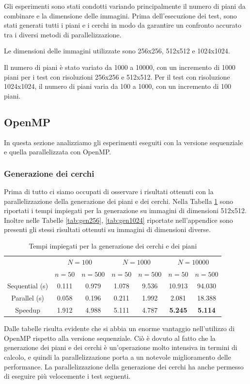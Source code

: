 Gli esperimenti sono stati condotti variando principalmente il numero di piani da combinare e la dimensione delle immagini.
Prima dell'esecuzione dei test, sono stati generati tutti i piani e i cerchi in modo da garantire un confronto accurato
tra i diversi metodi di parallelizzazione.\par
Le dimensioni delle immagini utilizzate sono 256x256, 512x512 e 1024x1024.

Il numero di piani è stato variato da 1000 a 10000, con un incremento di 1000 piani per i test con risoluzioni 256x256 e 512x512.
Per il test con risoluzione 1024x1024, il numero di piani varia da 100 a 1000, con un incremento di 100 piani.

\subsection{OpenMP}\label{subsec:test_openmp}
In questa sezione analizziamo gli esperimenti eseguiti con la versione sequenziale e quella parallelizzata con OpenMP.
\subsubsection{Generazione dei cerchi}
Prima di tutto ci siamo occupati di osservare i risultati ottenuti con la parallelizzazione della generazione dei piani e dei cerchi.
Nella Tabella \ref{tab:gen512} sono riportati i tempi impiegati per la generazione su immagini di dimensioni 512x512.
Inoltre nelle Tabelle \ref{tab:gen256}, \ref{tab:gen1024} riportate nell'appendice sono presenti gli stessi risultati ottenuti su immagini di dimensioni diverse.
\begin{table}[H]
    \centering
    \begin{tabular}{c|c|c|c|c|c|c|}
        & \multicolumn{2}{|c|}{$N = 100$} & \multicolumn{2}{|c|}{$N = 1000$} & \multicolumn{2}{|c|}{$N = 10000$} \\
        & $n=50$ & $n=500$ & $n=50$ & $n=500$ & $n=50$ & $n=500$ \\
        \hline
        Sequential (s) & 0.111 & 0.979 & 1.078 & 9.536 & 10.913 & 94.030 \\
        Parallel (s) & 0.058 & 0.196 & 0.211 & 1.992 & 2.081 & 18.388 \\
        Speedup & 1.912 & 4.988 & 5.111 & 4.787 & \textbf{5.245} & \textbf{5.114} \\
    \end{tabular}
    \caption{\label{tab:gen512}Tempi impiegati per la generazione dei cerchi e dei piani}
\end{table}
Dalle tabelle risulta evidente che si abbia un enorme vantaggio nell'utilizzo di OpenMP rispetto alla versione sequenziale.
Ciò è dovuto al fatto che la generazione dei piani e dei cerchi è un'operazione molto intensiva in termini di calcolo, e quindi la parallelizzazione porta a un notevole miglioramento delle performance.
La parallelizzazione della generazione dei cerchi ha anche permesso di eseguire più velocemente i test seguenti.

